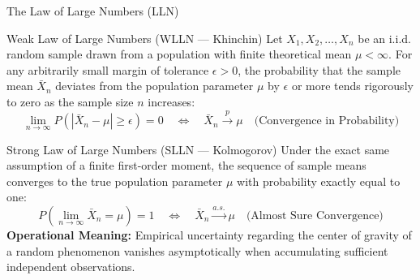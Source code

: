 \documentclass[10pt, aspectratio=169]{beamer}
\begin{document}
\begin{frame}{The Law of Large Numbers (LLN)}
  \fontsize{7.5pt}{9pt}\selectfont
  \begin{block}{Weak Law of Large Numbers (WLLN — Khinchin)}
    \fontsize{7.5pt}{9pt}\selectfont
    Let $X_1, X_2, \ldots, X_n$ be an i.i.d. random sample drawn from a population with finite theoretical mean $\mu < \infty$. For any arbitrarily small margin of tolerance $\epsilon > 0$, the probability that the sample mean $\bar{X}_n$ deviates from the population parameter $\mu$ by $\epsilon$ or more tends rigorously to zero as the sample size $n$ increases:
    $$\lim_{n \to \infty} P(|\bar{X}_n - \mu| \ge \epsilon) = 0 \quad \iff \quad \bar{X}_n \xrightarrow{p} \mu \quad \text{(Convergence in Probability)}$$
  \end{block}
  \vspace{-0.15cm}
  \pause
  \begin{alertblock}{Strong Law of Large Numbers (SLLN — Kolmogorov)}
    \fontsize{7.5pt}{9pt}\selectfont
    Under the exact same assumption of a finite first-order moment, the sequence of sample means converges to the true population parameter $\mu$ with probability exactly equal to one:
    $$P\left(\lim_{n \to \infty} \bar{X}_n = \mu\right) = 1 \quad \iff \quad \bar{X}_n \xrightarrow{a.s.} \mu \quad \text{(Almost Sure Convergence)}$$
    \textbf{Operational Meaning:} Empirical uncertainty regarding the center of gravity of a random phenomenon vanishes asymptotically when accumulating sufficient independent observations.
  \end{alertblock}
\end{frame}
\end{document}
